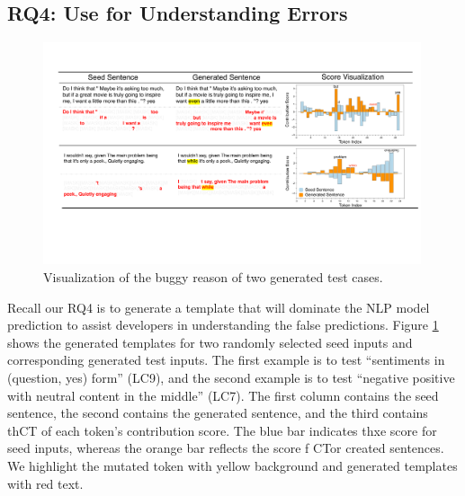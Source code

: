 \subsection{RQ4: Use \tool for Understanding Errors}


\begin{figure}
    \centering
    \includegraphics[width=0.99\textwidth]{figs/explain.pdf}
    \vspace{-4mm}
    \caption{Visualization of the buggy reason of two \tool generated test cases.}
    \label{fig:explain}
\end{figure}


Recall our RQ4 is to generate a template that will dominate the NLP model prediction to assist developers in understanding the false predictions. Figure \ref{fig:explain} shows the generated templates for two randomly selected seed inputs and corresponding generated test inputs.
The first example is to test ``sentiments in (question, yes) form'' (LC9), and the second example is to test ``negative positive with neutral content in the middle''  (LC7).
The first column contains the seed sentence, the second contains the generated sentence, and the third contains thCT  of each token's contribution score. The blue bar indicates thxe score for seed inputs, whereas the orange bar reflects the score f CTor created sentences.
We highlight the mutated token with yellow background and generated templates with red text. 

